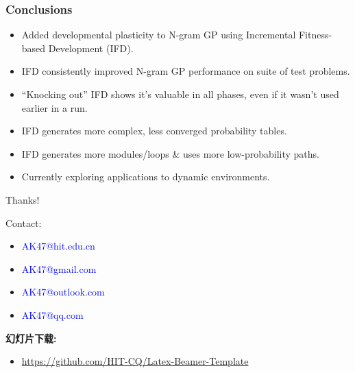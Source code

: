 \documentclass{beamer}
\newcommand{\linespace}{\vskip 0.25cm}
\begin{document}
\begin{frame}
\frametitle{Conclusions}

\begin{itemize}
  \item Added developmental plasticity to N-gram GP using Incremental Fitness-based Development (IFD).
\end{itemize}

\begin{itemize}
  \item IFD consistently improved N-gram GP performance on suite of test problems.
  
  \linespace
  
  \item ``Knocking out'' IFD shows it's valuable in all phases, even if it wasn't used earlier in a run.

  \linespace
  
  \item IFD generates more complex, less converged probability tables.
  \item IFD generates more modules/loops \& uses more low-probability paths.
\end{itemize}

\begin{itemize}
  \item Currently exploring applications to dynamic environments.
\end{itemize}

\end{frame}

\begin{frame}
	
	\begin{flushleft}
	{\huge Thanks!}
	\end{flushleft}
		
	\linespace
	\linespace
	
	Contact:  
	\begin{itemize}
		\item \textcolor{blue}{\textsf{AK47@hit.edu.cn}}
		\item \textcolor{blue}{\textsf{AK47@gmail.com}}
		\item \textcolor{blue}{\textsf{AK47@outlook.com}}
		\item \textcolor{blue}{\textsf{AK47@qq.com}}
	\end{itemize}
	\textbf{幻灯片下载:}  
	\begin{itemize}
		\item \textcolor{blue}{\textsf{\url{https://github.com/HIT-CQ/Latex-Beamer-Template}}}
	\end{itemize}
	\linespace
	\linespace
	
\end{frame}
\end{document}

